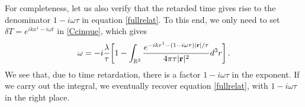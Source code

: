 \documentclass[a4paper, amsfonts, amssymb, amsmath, reprint, showkeys, nofootinbib, twoside,notitlepage,onecolumn]{revtex4-2}
\theoremstyle{definition}
\theoremstyle{theorem}
\theoremstyle{corollary}
\begin{document}
For completeness, let us also verify that the retarded time gives rise to the denominator $1{-}i\omega\tau$ in equation \eqref{fullrelat}. To this end, we only need to set $\delta T=e^{ikx^1-i\omega t}$ in \eqref{Ccinque}, which gives
\begin{equation}\label{Csei}
\omega =-i\dfrac{\lambda}{\tau} \bigg[1 - \int_{\mathbb{R}^3}  \dfrac{ e^{-ikr^1-(1-i\omega\tau) |\mathbf{r}|/\tau}}{4\pi \tau |\mathbf{r}|^2} d^3 r  \bigg]  \, . \\
\end{equation}
We see that, due to time retardation, there is a factor $1{-}i\omega\tau$ in the exponent. If we carry out the integral, we eventually recover equation \eqref{fullrelat}, with $1{-}i\omega\tau$ in the right place. 


\newpage







\label{lastpage}
\end{document}
